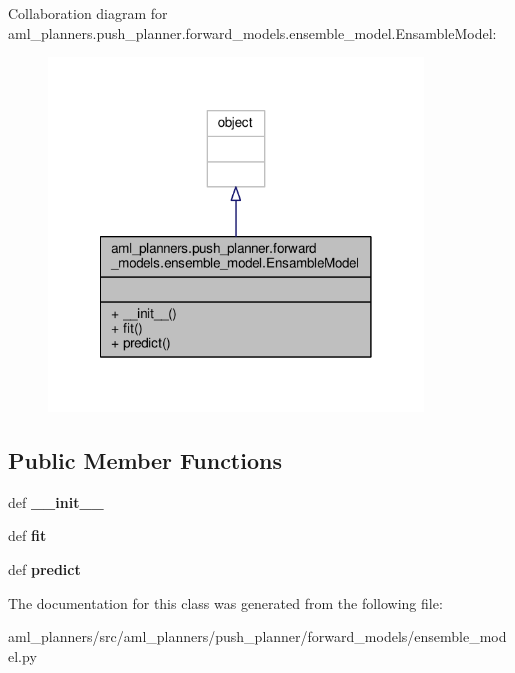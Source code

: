 Collaboration diagram for aml\-\_\-planners.\-push\-\_\-planner.\-forward\-\_\-models.\-ensemble\-\_\-model.\-Ensamble\-Model\-:
\nopagebreak
\begin{figure}[H]
\begin{center}
\leavevmode
\includegraphics[width=282pt]{classaml__planners_1_1push__planner_1_1forward__models_1_1ensemble__model_1_1_ensamble_model__coll__graph}
\end{center}
\end{figure}
\subsection*{Public Member Functions}
\begin{DoxyCompactItemize}
\item 
\hypertarget{classaml__planners_1_1push__planner_1_1forward__models_1_1ensemble__model_1_1_ensamble_model_ab482b605fc4cf21a7936722a2d1aec2d}{def {\bfseries \-\_\-\-\_\-init\-\_\-\-\_\-}}\label{classaml__planners_1_1push__planner_1_1forward__models_1_1ensemble__model_1_1_ensamble_model_ab482b605fc4cf21a7936722a2d1aec2d}

\item 
\hypertarget{classaml__planners_1_1push__planner_1_1forward__models_1_1ensemble__model_1_1_ensamble_model_a8fa811fef865b143d6bb09010f37ed54}{def {\bfseries fit}}\label{classaml__planners_1_1push__planner_1_1forward__models_1_1ensemble__model_1_1_ensamble_model_a8fa811fef865b143d6bb09010f37ed54}

\item 
\hypertarget{classaml__planners_1_1push__planner_1_1forward__models_1_1ensemble__model_1_1_ensamble_model_aaa51602a9010d5a6616f514e6b66007b}{def {\bfseries predict}}\label{classaml__planners_1_1push__planner_1_1forward__models_1_1ensemble__model_1_1_ensamble_model_aaa51602a9010d5a6616f514e6b66007b}

\end{DoxyCompactItemize}


The documentation for this class was generated from the following file\-:\begin{DoxyCompactItemize}
\item 
aml\-\_\-planners/src/aml\-\_\-planners/push\-\_\-planner/forward\-\_\-models/ensemble\-\_\-model.\-py\end{DoxyCompactItemize}
